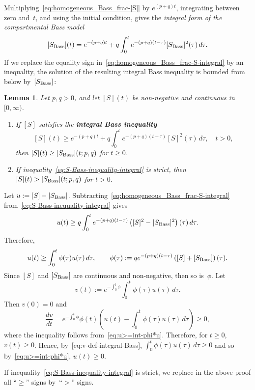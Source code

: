 \documentclass[review]{elsarticle}
\newtheorem{lemma}{Lemma}
\begin{document}
   
Multiplying~\eqref{eq:homogeneous_Bass_frac-[S]} by $e^{(p+q)t}$, integrating between zero and~$t$, and using the initial condition, gives the {\em integral form of the compartmental Bass model}
\begin{equation}
	\label{eq:homogeneous_Bass_frac-S-integral}
	[S_{\rm Bass}] (t) = e^{-(p+q)t} + q\int_0^t e^{-(p+q)(t-\tau)} [S_{\rm Bass}]^2(\tau) \, d\tau.
\end{equation}
If we replace the
equality sign in~\eqref{eq:homogeneous_Bass_frac-S-integral} by an inequality, the solution of the resulting  integral Bass inequality is bounded from below by~$[S_{\rm Bass}]$:
\begin{lemma}
	\label{lem:Bass-inequality-integral}
	Let $p,q>0$, and let $[S](t)$ be non-negative and continuous in~$[0, \infty)$. 
	\begin{enumerate}
		\item 
	If $[S]$ satisfies the {\bf  integral Bass inequality}
\begin{equation}
	\label{eq:S-Bass-inequality-integral}
	[S] (t) \ge  e^{-(p+q)t} + q\int_0^t e^{-(p+q)(t-\tau)} [S]^2(\tau) \, d\tau, \quad t>0,
\end{equation}
	then 
	$
	[S] (t) \ge 	[S_{\rm Bass}] (t;p,q)$ for $t \ge 0$.

	
	\item If  inequality~\eqref{eq:S-Bass-inequality-integral} is strict, then  
	$[S] (t) > 	[S_{\rm Bass}] (t;p,q)$ for $t>0$.
		\end{enumerate}
\end{lemma}
\begin{pf}
Let $u:=[S]-[S_{\rm Bass}]$. Subtracting~\eqref{eq:homogeneous_Bass_frac-S-integral} from~\eqref{eq:S-Bass-inequality-integral} gives
$$
  u(t) \ge q \int_0^t e^{-(p+q)(t-\tau)}  \left([S]^2-[S_{\rm Bass}]^2\right)(\tau) \, d\tau.
$$
Therefore,
\begin{eqnarray}
	\label{eq:u>=int-phi*u}
	u(t) \ge \int_0^t\phi(\tau) u(\tau) \, d\tau, 
	 \qquad \phi(\tau):=q e^{-(p+q)(t-\tau)}  \left([S]+[S_{\rm Bass}]\right)(\tau).%
\end{eqnarray}
%
%
Since $[S]$ and $[S_{\rm Bass}]$ are continuous and non-negative, then so is~$\phi$.
Let 
\begin{equation}
	\label{eq:v-def-integral-Bass}
 v(t):=e^{-\int_0^t \phi} \int_0^t\phi(\tau) u(\tau) \, d\tau.
\end{equation}
 Then
$v(0) = 0$  and
$$
  \frac{dv}{dt} = 
  e^{-\int_0^t \phi} \phi(t) 
  \left(u(t)- \int_0^t\phi(\tau) u(\tau) \, d\tau \right) \ge 0,
$$
where the inequality follows from~\eqref{eq:u>=int-phi*u}. Therefore,  for $t \ge 0$,  $v(t) \ge 0$.
Hence, by~\eqref{eq:v-def-integral-Bass}, $\int_0^t\phi(\tau) u(\tau) \, d\tau \ge 0$ and so by~\eqref{eq:u>=int-phi*u}, $u(t) \ge 0$.

If inequality~\eqref{eq:S-Bass-inequality-integral} is strict, we replace in the above proof all
 ``$\ge$'' signs by~``$>$'' signs.
\end{pf}
\end{document}
